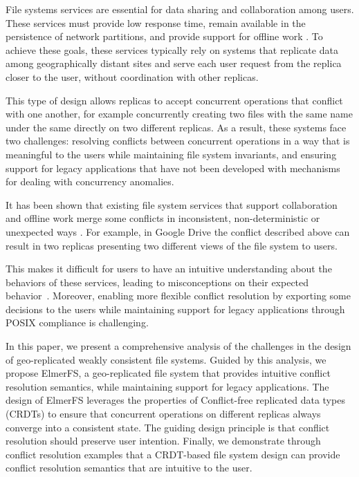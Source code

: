 \documentclass[sigconf,anonymous,10pt]{acmart}
\begin{document}
File systems services are essential for data sharing and collaboration among users.
These services must provide low response time, remain available in the persistence
of network partitions, and provide support for offline work \cite{howard1988scale}.
To achieve these goals, these services typically rely on systems that replicate
data among geographically distant sites and serve each user request from the replica
closer to the user, without coordination with other replicas.

This type of design allows replicas to accept concurrent operations that conflict
with one another, for example concurrently creating two files with the same name
under the same directly on two different replicas.
As a result, these systems face two challenges:
resolving conflicts between concurrent operations in a way that is meaningful to
the users while maintaining file system invariants,
and ensuring support for legacy applications that have not been developed with
mechanisms for dealing with concurrency anomalies.

It has been shown that existing file system services that support collaboration
and offline work merge some conflicts in inconsistent, non-deterministic or
unexpected ways \cite{cai2018some, taothanh:tel-01673030}.
For example, in Google Drive the conflict described above can result in two
replicas presenting two different views of the file system to users.

This makes it difficult for users to have an intuitive understanding about
the behaviors of these services,
leading to misconceptions on their expected behavior~\cite{tang2013you}.
Moreover, enabling more flexible conflict resolution by exporting some decisions
to the users while maintaining support for legacy applications through POSIX
compliance is challenging.

In this paper, we present a comprehensive analysis of the challenges in the
design of geo-replicated weakly consistent file systems.
Guided by this analysis, we propose ElmerFS,
a geo-replicated file system that provides intuitive conflict resolution
semantics, while maintaining support for legacy applications.
The design of ElmerFS leverages the properties of Conflict-free replicated data
types (CRDTs) to ensure that concurrent operations on different replicas always
converge into a consistent state.
The guiding design principle is that conflict resolution should preserve user
intention.
Finally, we demonstrate through conflict resolution examples that a CRDT-based
file system design can provide conflict resolution semantics that are intuitive
to the user.
\end{document}
